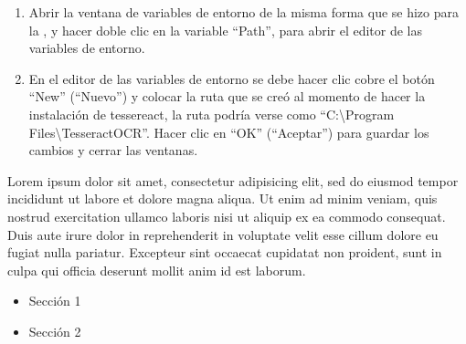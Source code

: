 \documentclass[letterpaper,10pt,openany,spanish]{sphinxmanual}
\begin{document}
\begin{enumerate}

\item {} 
Abrir la ventana de variables de entorno de la misma forma que se hizo para la {\hyperref[\detokenize{instalacion/instalacion_popple_teseract:instalacion-de-poppler}]{}}, y hacer doble clic en la variable “Path”, para abrir el editor de las variables de entorno.


\item {} 
En el editor de las variables de entorno se debe hacer clic cobre el botón “New” (“Nuevo”) y colocar la ruta que se creó al momento de hacer la instalación de tessereact, la ruta podría verse como “C:\textbackslash{}Program Files\textbackslash{}Tesseract\sphinxhyphen{}OCR”. Hacer clic en “OK” (“Aceptar”) para guardar los cambios y cerrar las ventanas.


\end{enumerate}

Lorem ipsum dolor sit amet, consectetur adipisicing elit, sed do eiusmod
tempor incididunt ut labore et dolore magna aliqua. Ut enim ad minim veniam,
quis nostrud exercitation ullamco laboris nisi ut aliquip ex ea commodo
consequat. Duis aute irure dolor in reprehenderit in voluptate velit esse
cillum dolore eu fugiat nulla pariatur. Excepteur sint occaecat cupidatat non
proident, sunt in culpa qui officia deserunt mollit anim id est laborum.
\begin{itemize}
\item {} 
Sección 1 {\hyperref[\detokenize{instalacion/instalacion_contexto:instalacion-basica}]{}}

\item {} 
Sección 2 {\hyperref[\detokenize{instalacion/instalacion_popple_teseract:instalacion-poppler-tesseract}]{}}

\end{itemize}
\end{document}
